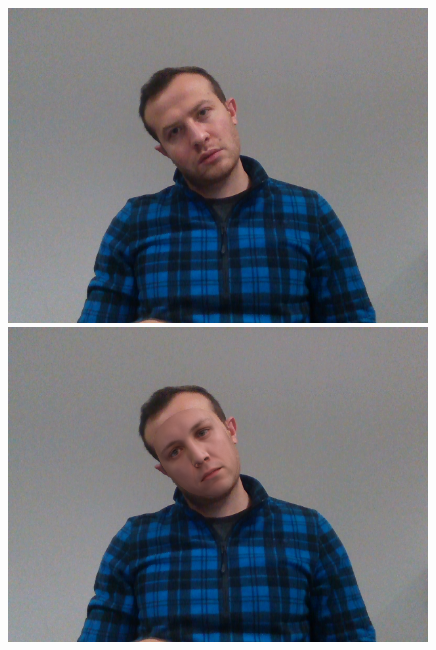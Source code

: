 \begin{figure}[h]
    \begin{minipage}{.325\textwidth}
      \centering
      \includegraphics[width=0.99\textwidth]{Figures/dataset/target/6.png}
    \end{minipage}
    \begin{minipage}{.325\textwidth}
      \centering
      \includegraphics[width=0.99\textwidth]{Figures/dataset/our/6blended.png}
    \end{minipage}
    \begin{minipage}{.325\textwidth}
      \centering

\end{minipage}
\end{figure}
